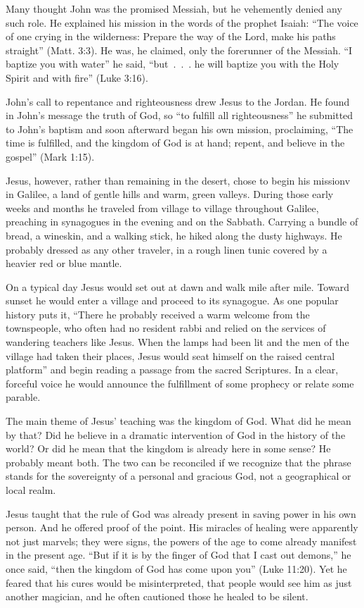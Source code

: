 Many thought John was the promised Messiah, but he vehemently denied any such role. He explained his
mission in the words of the prophet Isaiah: “The voice of one crying in the wilderness: Prepare the
way of the Lord, make his paths straight” (Matt. 3:3). He was, he claimed, only the forerunner of
the Messiah. “I baptize you with water” he said, “but~.~.~. he will baptize you with the Holy Spirit
and with fire” (Luke 3:16).

John’s call to repentance and righteousness drew Jesus to the Jordan. He found in John’s message the
truth of God, so “to fulfill all righteousness” he submitted to John’s baptism and soon afterward
began his own mission, proclaiming, “The time is fulfilled, and the kingdom of God is at hand;
repent, and believe in the gospel” (Mark 1:15).

Jesus, however, rather than remaining in the desert, chose to begin his missionv in Galilee, a land
of gentle hills and warm, green valleys. During those early weeks and months he traveled from
village to village throughout Galilee, preaching in synagogues in the evening and on the Sabbath.
Carrying a bundle of bread, a wineskin, and a walking stick, he hiked along the dusty highways. He
probably dressed as any other traveler, in a rough linen tunic covered by a heavier red or blue
mantle.

On a typical day Jesus would set out at dawn and walk mile after mile. Toward sunset he would enter
a village and proceed to its synagogue. As one popular history puts it, “There he probably received
a warm welcome from the townspeople, who often had no resident rabbi and relied on the services of
wandering teachers like Jesus. When the lamps had been lit and the men of the village had taken
their places, Jesus would seat himself on the raised central platform” and begin reading a passage
from the sacred Scriptures. In a clear, forceful voice he would announce the fulfillment of some
prophecy or relate some parable.

The main theme of Jesus’ teaching was the kingdom of God. What did he mean by that? Did he believe
in a dramatic intervention of God in the history of the world? Or did he mean that the kingdom is
already here in some sense? He probably meant both. The two can be reconciled if we recognize that
the phrase stands for the sovereignty of a personal and gracious God, not a geographical or local
realm.

Jesus taught that the rule of God was already present in saving power in his own person. And he
offered proof of the point. His miracles of healing were apparently not just marvels; they were
signs, the powers of the age to come already manifest in the present age. “But if it is by the
finger of God that I cast out demons,” he once said, “then the kingdom of God has come upon you”
(Luke 11:20). Yet he feared that his cures would be misinterpreted, that people would see him as
just another magician, and he often cautioned those he healed to be silent.

